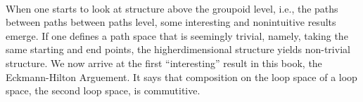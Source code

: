 \documentclass[11pt, a4paper]{article}
\begin{document}
\begin{code}
%
\>[6]\AgdaSpace{}%
\AgdaSymbol{:}\AgdaSpace{}%
\AgdaSymbol{(}\AgdaSpace{}%
\AgdaSymbol{:}\AgdaSpace{}%
\AgdaSymbol{)}\AgdaSpace{}%
\AgdaSpace{}%
\AgdaSpace{}%
\AgdaSpace{}%
\AgdaSpace{}%
\<%
\\
%
\>[6]\AgdaSpace{}%
\AgdaSpace{}%
\AgdaSymbol{=}\AgdaSpace{}%
\<%
\\
%
\>[6]\AgdaSpace{}%
\AgdaSymbol{:}\AgdaSpace{}%
\AgdaSymbol{(}\AgdaSpace{}%
\AgdaSymbol{:}\AgdaSpace{}%
\AgdaSymbol{)}\AgdaSpace{}%
\AgdaSpace{}%
\AgdaSpace{}%
\AgdaSpace{}%
\AgdaSpace{}%
\<%
\\
%
\>[6]\AgdaSpace{}%
\AgdaSpace{}%
\AgdaSpace{}%
\AgdaSpace{}%
\AgdaSymbol{=}\AgdaSpace{}%
\AgdaSpace{}%
\AgdaSpace{}%
\AgdaSpace{}%
\AgdaSpace{}%
\AgdaSpace{}%
\<%
\\
%
\>[6]\AgdaSpace{}%
\AgdaSymbol{:}\AgdaSpace{}%
\AgdaSymbol{(}\AgdaSpace{}%
\AgdaSymbol{:}\AgdaSpace{}%
\AgdaSymbol{)}\AgdaSpace{}%
\AgdaSpace{}%
\AgdaSpace{}%
\AgdaSpace{}%
\AgdaSpace{}%
\<%
\\
%
\>[6]\AgdaSpace{}%
\AgdaSpace{}%
\AgdaSpace{}%
\AgdaSpace{}%
\AgdaSpace{}%
\AgdaSpace{}%
\AgdaSymbol{=}\AgdaSpace{}%
\AgdaSpace{}%
\AgdaSpace{}%
\AgdaSpace{}%
\AgdaSpace{}%
\AgdaSpace{}%
\AgdaSpace{}%
\AgdaSpace{}%
\<%
\\
\>[0]\<%
\end{code}

When one starts to look at structure above the groupoid level, i.e., the paths between paths between paths level, some interesting and nonintuitive results emerge. If one defines a path space that is seemingly trivial, namely, taking the same starting and end points, the higherdimensional structure yields non-trivial structure. 
We now arrive at the first ``interesting'' result in this book, the Eckmann-Hilton Arguement. It says that composition on the loop space of a loop space, the second loop space, is commutitive.
\end{document}
